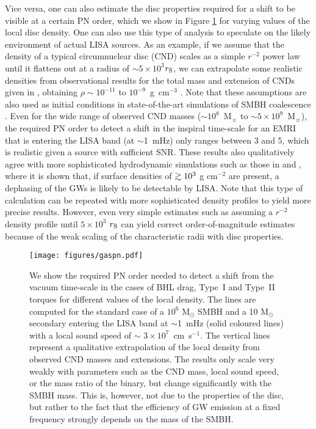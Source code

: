 \documentclass[usenatbib]{mnras}
\def\gsim{\mathrel{\rlap{\lower 3pt \hbox{$\sim$}} \raise 2.0pt \hbox{$>$}}}
\begin{document}
Vice versa, one can also estimate the disc properties required for a shift to be visible at a certain PN order, which we show in Figure \ref{fig:gaspn} for varying values of the local disc density. One can also use this type of analysis to speculate on the likely environment of actual LISA sources. As an example, if we assume that the density of a typical circumnuclear disc (CND) scales as a simple $r^{-2}$ power law \citep{1963MNRAS.126..553M} until it flattens out at a radius of $\sim$$5 \times 10^3 $$r_{\rm S}$, we can extrapolate some realistic densities from observational results for the total mass and extension of CNDs given in \cite{2014ApJ...784...70M}, obtaining $\rho \sim 10^{-11}$ to $10^{-9}$~g~cm$^{-3}$ \citep[a result more consistent with the disc models in][]{2003MNRAS.341..501S}. Note that these assumptions are also used as initial conditions in state-of-the-art simulations of SMBH coalescence \citep[see, e.g.][]{2017ApJ...838...13S,2020ApJ...899..126S}. Even for the wide range of observed CND masses ($\sim$$10^8$~M$_{\sun}$ to $\sim$$5\times 10^9$~M$_{\sun}$), the required PN order to detect a shift in the inspiral time-scale for an EMRI that is entering the LISA band (at $\sim$1~mHz) only ranges between 3 and 5, which is realistic given a source with sufficient SNR. These results also qualitatively agree with more sophisticated hydrodynamic simulations such as those in \citet{2019MNRAS.486.2754D} and \citet{2020arXiv200511333D}, where it is shown that, if surface densities of $ \gsim 10^3$ g cm$^{-2}$ are present, a dephasing of the GWs is likely to be detectable by LISA. Note that this type of calculation can be repeated with more sophisticated density profiles to yield more precise results. However, even very simple estimates such as assuming a $r^{-2}$ density profile until $5 \times 10^3$ $r_{\rm S}$ can yield correct order-of-magnitude estimates because of the weak scaling of the characteristic radii with disc properties.

\begin{figure}
    \centering
    \texttt{[image: figures/gaspn.pdf]}
    \caption{We show the required PN order needed to detect a shift from the vacuum time-scale in the cases of BHL drag, Type~I and Type~II torques for different values of the local density. The lines are computed for the standard case of a $10^6$ M$_{\odot}$ SMBH and a 10 M$_{\odot}$ secondary entering the LISA band at $\sim$1~mHz (solid coloured lines) with a local sound speed of $\sim$ $3 \times 10^7$~cm~s$^{-1}$. The vertical lines represent a qualitative extrapolation of the local density from observed CND masses and extensions. The results only scale very weakly with parameters such as the CND mass, local sound speed, or the mass ratio of the binary, but change significantly with the SMBH mass. This is, however, not due to the properties of the disc, but rather to the fact that the efficiency of GW emission at a fixed frequency strongly depends on the mass of the SMBH.}
    \label{fig:gaspn}
\end{figure}
\end{document}
